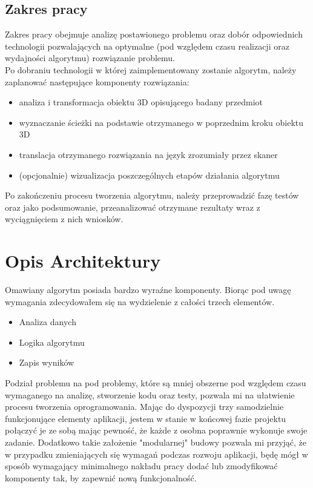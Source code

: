 \documentclass[a4paper,12pt,twoside,openany]{report}
\begin{document}
    \subsection{Zakres pracy}
      Zakres pracy obejmuje analizę postawionego problemu oraz dobór odpowiednich technologii pozwalających 
      na optymalne (pod względem czasu realizacji oraz wydajności algorytmu) rozwiązanie problemu.
      \\
      Po dobraniu technologii w której zaimplementowany zostanie algorytm, należy zaplanować 
      następujące komponenty rozwiązania:
      \begin{itemize}
        \item analiza i transformacja obiektu 3D opisującego badany przedmiot
        \item wyznaczanie ścieżki na podstawie otrzymanego w poprzednim kroku obiektu 3D
        \item translacja otrzymanego rozwiązania na język zrozumiały przez skaner
        \item (opcjonalnie) wizualizacja poszczególnych etapów działania algorytmu
      \end{itemize}
      Po zakończeniu procesu tworzenia algorytmu, należy przeprowadzić fazę testów oraz jako podsumowanie, 
      przeanalizować otrzymane rezultaty wraz z wyciągnięciem z nich wniosków.
  
  \section{Opis Architektury}
    Omawiany algorytm posiada bardzo wyraźne komponenty. Biorąc pod uwagę wymagania 
    zdecydowałem się na wydzielenie z całości trzech elementów. 
    \begin{itemize}
      \item Analiza danych
      \item Logika algorytmu
      \item Zapis wyników
    \end{itemize}
    Podział problemu na pod problemy, które są mniej obszerne pod względem czasu wymaganego na analizę, 
    stworzenie kodu oraz testy, pozwala mi na ułatwienie procesu tworzenia oprogramowania.
    Mając do dyspozycji trzy samodzielnie funkcjonujące elementy aplikacji, jestem w stanie 
    w końcowej fazie projektu połączyć je ze sobą mając pewność, że każde z osobna poprawnie 
    wykonuje swoje zadanie. Dodatkowo takie założenie "modularnej" budowy pozwala mi przyjąć, 
    że w przypadku zmieniających się wymagań podczas rozwoju aplikacji, będę mógł w sposób 
    wymagający minimalnego nakładu pracy dodać lub zmodyfikować komponenty tak, by zapewnić nową funkcjonalność.
\end{document}
